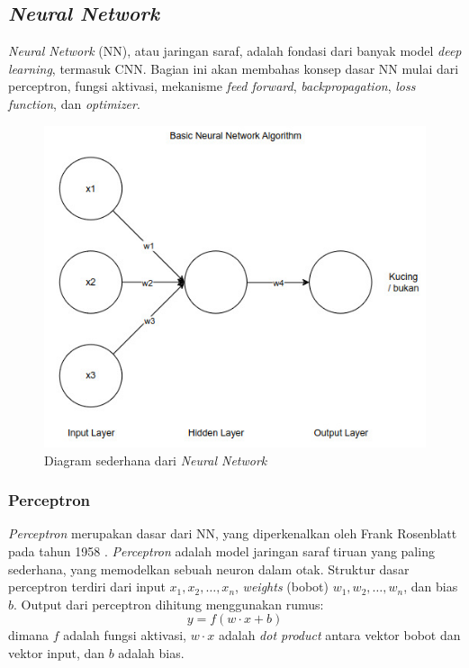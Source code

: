 \subsection{\emph{Neural Network}}
\emph{Neural Network} (NN), atau jaringan saraf, adalah fondasi dari banyak model \emph{deep learning}, termasuk CNN. Bagian ini akan membahas konsep dasar NN mulai dari perceptron, fungsi aktivasi, mekanisme \emph{feed forward}, \emph{backpropagation}, \emph{loss function}, dan \emph{optimizer}.

\begin{figure}[H]
  \centering
  \includegraphics[scale=0.6]{gambar/bab2-basic-nn.jpeg}
  \caption{Diagram sederhana dari \emph{Neural Network}}
  \label{fig:basic_nn}
\end{figure}

\subsubsection{Perceptron}
\emph{Perceptron} merupakan dasar dari NN, yang diperkenalkan oleh Frank Rosenblatt pada tahun 1958 \parencite*{rosenblatt1958perceptron}. \emph{Perceptron} adalah model jaringan saraf tiruan yang paling sederhana, yang memodelkan sebuah neuron dalam otak. Struktur dasar perceptron terdiri dari input \( x_1, x_2, \dots, x_n \), \emph{weights} (bobot) \( w_1, w_2, \dots, w_n \), dan bias \( b \). Output dari perceptron dihitung menggunakan rumus:
\[ y = f(w \cdot x + b) \]
dimana \( f \) adalah fungsi aktivasi, \( w \cdot x \) adalah \emph{dot product} antara vektor bobot dan vektor input, dan \( b \) adalah bias.

